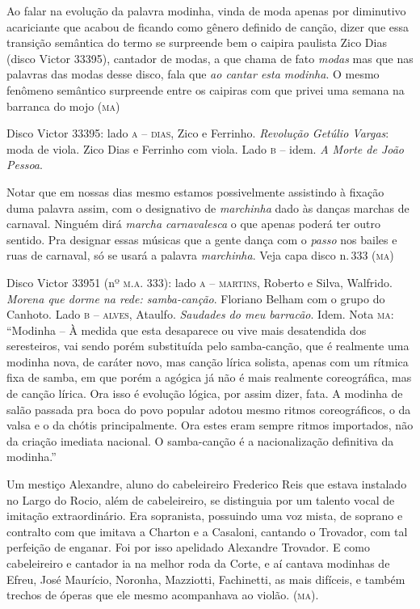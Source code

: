 Ao falar na evolução da palavra modinha, vinda de moda apenas por
diminutivo acariciante que acabou de ficando como gênero definido de
canção, dizer que essa transição semântica do termo se surpreende bem o
caipira paulista Zico Dias (disco Victor 33395), cantador de modas, a
que chama de fato \textit{modas} mas que nas palavras das modas desse disco,
fala que \textit{ao cantar esta modinha}. O mesmo fenômeno semântico surpreende
entre os caipiras com que privei uma semana na barranca do mojo (\textsc{ma})

Disco Victor 33395: lado \textsc{a} -- \textsc{dias}, Zico e Ferrinho. \emph{Revolução
Getúlio Vargas}: moda de viola. Zico Dias e Ferrinho com viola. Lado \textsc{b} --
idem. \emph{A Morte de João Pessoa}.

Notar que em nossas dias mesmo estamos possivelmente assistindo à
fixação duma palavra assim, com o designativo de \textit{marchinha} dado às
danças marchas de carnaval. Ninguém dirá \textit{marcha carnavalesca} o que
apenas poderá ter outro sentido. Pra designar essas músicas que a gente
dança com o \textit{passo} nos bailes e ruas de carnaval, só se usará a palavra
\textit{marchinha}. Veja capa disco n.\,333 (\textsc{ma})

Disco Victor 33951 (nº \textsc{m.a.} 333): lado \textsc{a} -- \textsc{martins}, Roberto e Silva,
Walfrido. \emph{Morena que dorme na rede: samba-canção}. Floriano Belham
com o grupo do Canhoto. Lado \textsc{b} -- \textsc{alves}, Ataulfo. \emph{Saudades do meu
barracão}. Idem. Nota \textsc{ma}: ``Modinha -- À medida que esta desaparece ou
vive mais desatendida dos seresteiros, vai sendo porém substituída pelo
samba-canção, que é realmente uma modinha nova, de caráter novo, mas
canção lírica solista, apenas com um rítmica fixa de samba, em que porém
a agógica já não é mais realmente coreográfica, mas de canção lírica.
Ora isso é evolução lógica, por assim dizer, fata. A modinha de salão
passada pra boca do povo popular adotou mesmo ritmos coreográficos, o da
valsa e o da chótis principalmente. Ora estes eram sempre ritmos
importados, não da criação imediata nacional. O samba-canção é a
nacionalização definitiva da modinha.''

Um mestiço Alexandre, aluno do cabeleireiro Frederico Reis que estava
instalado no Largo do Rocio, além de cabeleireiro, se distinguia por um
talento vocal de imitação extraordinário. Era sopranista, possuindo uma
voz mista, de soprano e contralto com que imitava a Charton e a
Casaloni, cantando o Trovador, com tal perfeição de enganar. Foi por
isso apelidado Alexandre Trovador. E como cabeleireiro e cantador ia na
melhor roda da Corte, e aí cantava modinhas de Efreu, José Maurício,
Noronha, Mazziotti, Fachinetti, as mais difíceis, e também trechos de
óperas que ele mesmo acompanhava ao violão. (\textsc{ma}).

